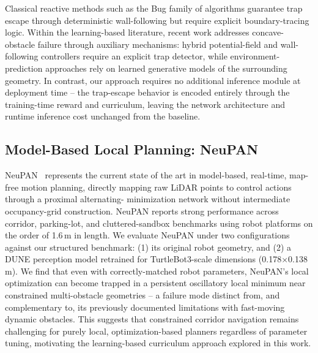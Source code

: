Classical reactive methods such as the Bug family of algorithms
guarantee trap escape through deterministic wall-following but require
explicit boundary-tracing logic. Within the learning-based literature,
recent work addresses concave-obstacle failure through auxiliary
mechanisms: hybrid potential-field and wall-following controllers
require an explicit trap detector, while environment-prediction
approaches rely on learned generative models of the surrounding
geometry. In contrast, our approach requires no additional inference
module at deployment time -- the trap-escape behavior is encoded
entirely through the training-time reward and curriculum, leaving the
network architecture and runtime inference cost unchanged from the
baseline.

\subsection{Model-Based Local Planning: NeuPAN}

NeuPAN~\cite{han2025neupan} represents the current state of the art in
model-based, real-time, map-free motion planning, directly mapping raw
LiDAR points to control actions through a proximal alternating-
minimization network without intermediate occupancy-grid construction.
NeuPAN reports strong performance across corridor, parking-lot, and
cluttered-sandbox benchmarks using robot platforms on the order of
1.6\,m in length. We evaluate NeuPAN under two configurations against
our structured benchmark: (1) its original robot geometry, and (2) a
DUNE perception model retrained for TurtleBot3-scale dimensions
(0.178$\times$0.138\,m). We find that even with correctly-matched
robot parameters, NeuPAN's local optimization can become trapped in a
persistent oscillatory local minimum near constrained multi-obstacle
geometries -- a failure mode distinct from, and complementary to, its
previously documented limitations with fast-moving dynamic obstacles.
This suggests that constrained corridor navigation remains challenging
for purely local, optimization-based planners regardless of parameter
tuning, motivating the learning-based curriculum approach explored in
this work.

